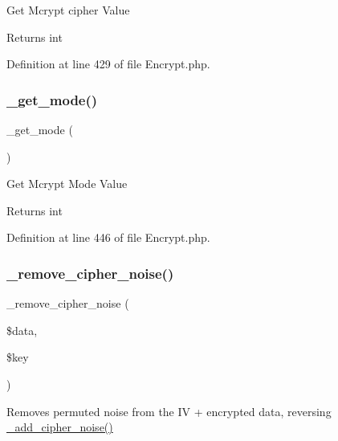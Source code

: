 Get Mcrypt cipher Value

\begin{DoxyReturn}{Returns}
int 
\end{DoxyReturn}


Definition at line 429 of file Encrypt.\+php.

\mbox{\label{class_c_i___encrypt_a8c6526d9458754249ee7268ead883a6c}} 
\subsubsection{\texorpdfstring{\_get\_mode()}{\_get\_mode()}}
{\footnotesize\ttfamily \+\_\+get\+\_\+mode (\begin{DoxyParamCaption}{ }\end{DoxyParamCaption})\hspace{0.3cm}{\ttfamily [protected]}}

Get Mcrypt Mode Value

\begin{DoxyReturn}{Returns}
int 
\end{DoxyReturn}


Definition at line 446 of file Encrypt.\+php.

\mbox{\label{class_c_i___encrypt_a35c2675b85803d42231d1f8353fa8dac}} 
\subsubsection{\texorpdfstring{\_remove\_cipher\_noise()}{\_remove\_cipher\_noise()}}
{\footnotesize\ttfamily \+\_\+remove\+\_\+cipher\+\_\+noise (\begin{DoxyParamCaption}\item[{}]{\$data,  }\item[{}]{\$key }\end{DoxyParamCaption})\hspace{0.3cm}{\ttfamily [protected]}}

Removes permuted noise from the IV + encrypted data, reversing \mbox{\hyperlink{class_c_i___encrypt_ada423e99876a54e7bc33afc9899d01a2}{\+\_\+add\+\_\+cipher\+\_\+noise()}}

